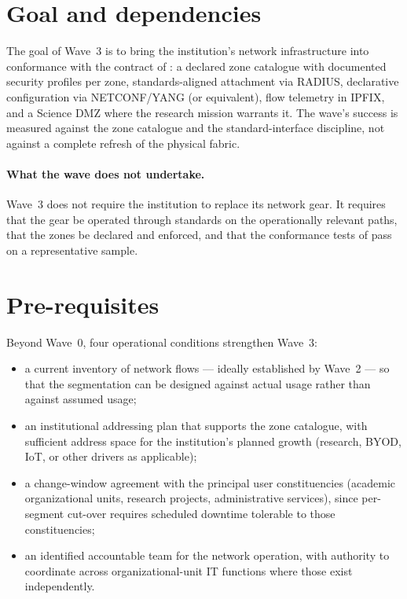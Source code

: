 \section{Goal and dependencies}
\label{sec:w3-goal}

The goal of Wave~3 is to bring the institution's network
infrastructure into conformance with the contract of
: a declared zone catalogue with documented
security profiles per zone, standards-aligned attachment via
RADIUS, declarative configuration via NETCONF/YANG (or equivalent),
flow telemetry in IPFIX, and a Science DMZ where the research
mission warrants it. The wave's success is measured against the
zone catalogue and the standard-interface discipline, not against
a complete refresh of the physical fabric.

\paragraph{What the wave does not undertake.} Wave~3 does not
require the institution to replace its network gear. It requires
that the gear be operated through standards on the operationally
relevant paths, that the zones be declared and enforced, and that
the conformance tests of  pass on a
representative sample.

\section{Pre-requisites}
\label{sec:w3-prereq}

Beyond Wave~0, four operational conditions strengthen Wave~3:

\begin{itemize}[leftmargin=1.5em,nosep]
  \item a current inventory of network flows --- ideally
    established by Wave~2 --- so that the segmentation can be
    designed against actual usage rather than against assumed
    usage;
  \item an institutional addressing plan that supports the zone
    catalogue, with sufficient address space for the institution's planned
    growth (research, BYOD, IoT, or other drivers as applicable);
  \item a change-window agreement with the principal user
    constituencies (academic organizational units, research
    projects, administrative services), since per-segment cut-over
    requires scheduled
    downtime tolerable to those constituencies;
  \item an identified accountable team for the network operation,
    with authority to coordinate across organizational-unit IT
    functions where those exist independently.
\end{itemize}

